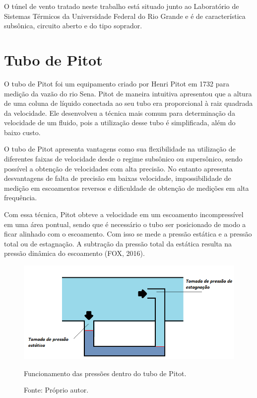 O túnel de vento tratado neste trabalho está situado junto ao Laboratório de Sistemas Térmicos da Universidade Federal 
do Rio Grande e é de característica subsônica, circuito aberto e do tipo soprador.

\section{Tubo de Pitot}

O tubo de Pitot foi um equipamento criado por Henri Pitot em 1732 para medição da vazão do rio Sena. 
Pitot de maneira intuitiva apresentou que a altura de uma coluna de líquido conectada ao seu tubo era 
proporcional à raiz quadrada da velocidade. Ele desenvolveu a técnica mais comum para determinação 
da velocidade de um fluido, pois a utilização desse tubo é simplificada, além do baixo custo.

O tubo de Pitot apresenta vantagens como sua flexibilidade na utilização de diferentes faixas de velocidade 
desde o regime subsônico ou supersônico, sendo possível a obtenção de velocidades com alta precisão. 
No entanto apresenta desvantagens de falta de precisão em baixas velocidade, impossibilidade de medição 
em escoamentos reversos e dificuldade de obtenção de medições em alta frequência.

Com essa técnica, Pitot obteve a velocidade em um escoamento incompressível em uma área pontual, sendo que 
é necessário o tubo ser posicionado de modo a ficar alinhado com o escoamento. Com isso se mede a pressão 
estática e a pressão total ou de estagnação. A subtração da pressão total da estática resulta na pressão 
dinâmica do escoamento (FOX, 2016).

\begin{figure}[!htb]
\centering
\includegraphics[scale = 0.7]{figuras/2-1}
\caption{Funcionamento das pressões dentro do tubo de Pitot.}
\caption*{Fonte: Próprio autor.}
\label{figpestagnacao}
\end{figure}

